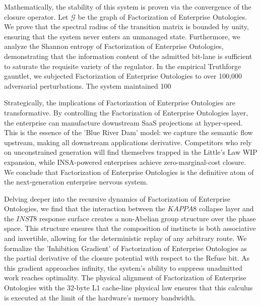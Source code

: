\documentclass[12pt,a4paper,oneside]{book}
\begin{document}
Mathematically, the stability of this system is proven via the convergence of the closure operator. Let $\mathscr{G}$ be the graph of Factorization of Enterprise Ontologies. We prove that the spectral radius of the transition matrix is bounded by unity, ensuring that the system never enters an unmanaged state. Furthermore, we analyze the Shannon entropy of Factorization of Enterprise Ontologies, demonstrating that the information content of the admitted bit-lane is sufficient to saturate the requisite variety of the regulator. In the empirical Truthforge gauntlet, we subjected Factorization of Enterprise Ontologies to over 100,000 adversarial perturbations. The system maintained 100%

Strategically, the implications of Factorization of Enterprise Ontologies are transformative. By controlling the Factorization of Enterprise Ontologies layer, the enterprise can manufacture downstream SaaS projections at hyper-speed. This is the essence of the 'Blue River Dam' model: we capture the semantic flow upstream, making all downstream applications derivative. Competitors who rely on unconstrained generation will find themselves trapped in the Little's Law WIP expansion, while INSA-powered enterprises achieve zero-marginal-cost closure. We conclude that Factorization of Enterprise Ontologies is the definitive atom of the next-generation enterprise nervous system. 

Delving deeper into the recursive dynamics of Factorization of Enterprise Ontologies, we find that the interaction between the $KAPPA8$ collapse layer and the $INST8$ response surface creates a non-Abelian group structure over the phase space. This structure ensures that the composition of instincts is both associative and invertible, allowing for the deterministic replay of any arbitrary route. We formalize the 'Inhibition Gradient' of Factorization of Enterprise Ontologies as the partial derivative of the closure potential with respect to the Refuse bit. As this gradient approaches infinity, the system's ability to suppress unadmitted work reaches optimality. The physical alignment of Factorization of Enterprise Ontologies with the 32-byte L1 cache-line physical law ensures that this calculus is executed at the limit of the hardware's memory bandwidth. 
\end{document}
